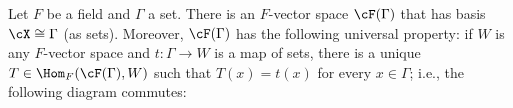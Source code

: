     \begin{theorem}\label{thm:free-vectorspace}
        Let $F$ be a field and $\Gamma$ a set. There is an $F$-vector space $\cF(\Gamma)$ that has basis $\cX \cong \Gamma$ (as sets). Moreover, $\cF(\Gamma)$ has the following universal property: if $W$ is any $F$-vector space and $t:\Gamma \rightarrow W$ is a map of sets, there is a unique $T \in \Hom_F(\cF(\Gamma),W)$ such that $T(x) = t(x)$ for every $x \in \Gamma$; i.e., the following diagram commutes:
            \begin{center}
            \end{center}
    \end{theorem}
